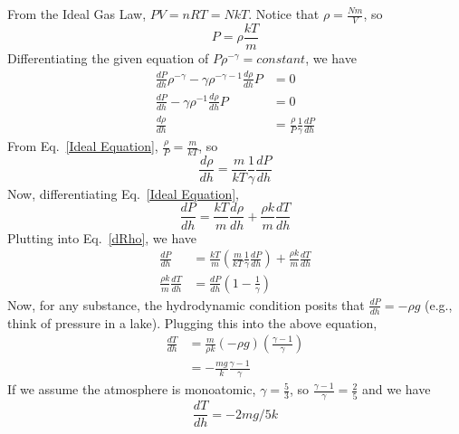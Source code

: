 \documentclass{article}
\begin{document}
From the Ideal Gas Law, $PV = nRT = NkT$. Notice that $\rho = \frac{Nm}{V}$, so
\begin{equation}
P = \rho\frac{kT}{m}
\label{Ideal Equation}
\end{equation}
Differentiating the given equation of $P\rho^{-\gamma} = constant$, we have
\begin{align*}
\frac{dP}{dh}\rho^{-\gamma} - \gamma\rho^{-\gamma-1}\frac{d\rho}{dh}P &= 0 \\
\frac{dP}{dh} - \gamma\rho^{-1}\frac{d\rho}{dh}P &= 0 \\
\frac{d\rho}{dh} &= \frac{\rho}{P}\frac{1}{\gamma}\frac{dP}{dh}
\end{align*}
From Eq.~\ref{Ideal Equation}, $\frac{\rho}{P} = \frac{m}{kT}$, so
\begin{equation}
\frac{d\rho}{dh} = \frac{m}{kT}\frac{1}{\gamma}\frac{dP}{dh}
\label{dRho}
\end{equation}
Now, differentiating Eq.~\ref{Ideal Equation},
\begin{equation}
\frac{dP}{dh} = \frac{kT}{m}\frac{d\rho}{dh} + \frac{\rho k}{m}\frac{dT}{dh}
\end{equation}
Plutting into Eq.~\ref{dRho}, we have
\begin{align*}
\frac{dP}{dh} &= \frac{kT}{m}\left(\frac{m}{kT}\frac{1}{\gamma}\frac{dP}{dh}\right) + \frac{\rho k}{m}\frac{dT}{dh} \\
\frac{\rho k}{m}\frac{dT}{dh} &= \frac{dP}{dh}\left(1-\frac{1}{\gamma}\right)
\end{align*}
Now, for any substance, the hydrodynamic condition posits that $\frac{dP}{dh} = -\rho g$ (e.g., think of pressure in a lake). Plugging this into the above equation,
\begin{align*}
\frac{dT}{dh} &= \frac{m}{\rho k}\left(-\rho g\right)\left(\frac{\gamma-1}{\gamma}\right) \\
&= -\frac{mg}{k}\frac{\gamma-1}{\gamma}
\end{align*}
If we assume the atmosphere is monoatomic, $\gamma = \frac{5}{3}$, so $\frac{\gamma-1}{\gamma} = \frac{2}{5}$ and we have
\begin{equation}
\frac{dT}{dh} = -2mg/5k
\end{equation}
\end{document}
